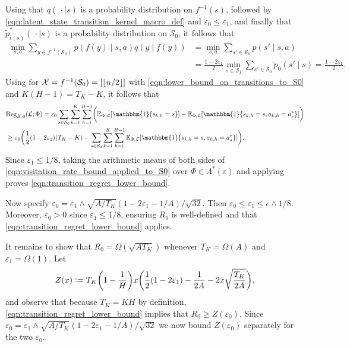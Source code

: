 \documentclass[11pt]{article}
\newcommand{\eqdef}{\vcentcolon=}
\newcommand{\mcL}{\mathcal{L}}
\newcommand{\mcS}{\mathcal{S}}
\newcommand{\mcX}{\mathcal{X}}
\newcommand{\mbbE}{\mathbb{E}}
\newcommand{\reg}{\textnormal{Reg}}
\DeclarePairedDelimiter\floor{\lfloor}{\rfloor}
\theoremstyle{definition}
\theoremstyle{definition}
\begin{document}
Using that $q(\,\cdot \mid s)$ is a probability distribution on $f^{-1}(s)$, followed by \eqref{eqn:latent_state_transition_kernel_macro_def} and $\varepsilon_0\leq \varepsilon_1$, and finally that $\tilde{p}^*_{\iota(s)}(\,\cdot\mid s)$ is a probability distribution on $\mcS_0$, it follows that
\begin{align}
	\min_{s,a}
	\sum_{y\in f^{-1}(\mcS_0)}
	p(f(y)\mid s,a)
	q(y\mid f(y))
	&
	=
	\min_{s,a}
	\sum_{s'\in\mcS_0}
	p(s'\mid s,a)
	\nonumber
	\\
	&
	=
	\frac{1-2\varepsilon_1}{2}
	\min_{s\in\mcS_1}
	\sum_{s'\in\mcS_0}
	\tilde{p}_0(s'\mid s)
	=
	\frac{1-2\varepsilon_1}{2}
	.
	\label{eqn:lower_bound_on_transitions_to_S0}
\end{align}
Using  for $\mcX=f^{-1}(\mcS_0)=[\floor{n/2}]$ with \eqref{eqn:lower_bound_on_transitions_to_S0} and $K(H-1)=T_K-K$, it follows that
\begin{align}
	\nonumber
	 &
	\reg_{K,0}(\mcL;\Phi)
	=
	\varepsilon_{0}
	\sum_{s\in\mcS_0}
	\sum_{k=1}^K
	\sum_{h=1}^{H-1}
	\biggl(
	\mbbE_{\Phi,\mcL}[\mathbbm{1}\{s_{k,h}=s\}]
	-
	\mbbE_{\Phi,\mcL}[\mathbbm{1}\{s_{k,h}=s,a_{k,h}=a_s^*\}]\biggr)
	\\
	 &
	\geq
	\varepsilon_{0}
	\biggl(
	\frac{1}{2}(1-2\varepsilon_1)(T_K-K)
	-
	\sum_{s\in\mcS_0}
	\sum_{k=1}^K
	\sum_{h=1}^{H-1}
	\mbbE_{\Phi,\mcL}[\mathbbm{1}\{s_{k,h}=s,a_{k,h}=a_s^*\}]
	\biggr)
	.
	\label{eqn:visitation_rate_bound_applied_to_S0}
\end{align} 
Since $\varepsilon_1\leq 1/8$, taking the arithmetic means of both sides of \eqref{eqn:visitation_rate_bound_applied_to_S0} over $\Phi\in \Lambda^*(\varepsilon)$ and applying  proves \eqref{eqn:transition_regret_lower_bound}.

Now specify $\varepsilon_0 = \varepsilon_1\wedge \sqrt{A/T_K}(1-2\varepsilon_1-1/A)/\sqrt{32}$.
Then $\varepsilon_0\leq \varepsilon_1\leq \epsilon \wedge 1/8$.
Moreover, $\varepsilon_0 > 0$ since $\varepsilon_1\leq 1/8$, ensuring $R_0$ is well-defined and that \eqref{eqn:transition_regret_lower_bound} applies.

It remains to show that $R_0 = \Omega(\sqrt{AT_K})$ whenever $T_K=\Omega(A)$ and $\varepsilon_1=\Omega(1)$.
Let
\begin{equation}
	Z(x)
	\eqdef
	T_K\biggl(1-\frac{1}{H}\biggr)
	x
	\biggl(
	\frac{1}{2}(1-2\varepsilon_1)
	-
	\frac{1}{2A}
	-
	2x\sqrt{ \frac{T_K}{2A}}
	\biggr)
	,
\end{equation}
and observe that because $T_K=KH$ by definition, \eqref{eqn:transition_regret_lower_bound} implies that $R_0\geq Z(\varepsilon_0)$.
Since $\varepsilon_0 = \varepsilon_1 \wedge \sqrt{A/T_K}(1-2\varepsilon_1-1/A)/\sqrt{32}$ we now bound $Z(\varepsilon_0)$ separately for the two $\varepsilon_0$.
\end{document}
